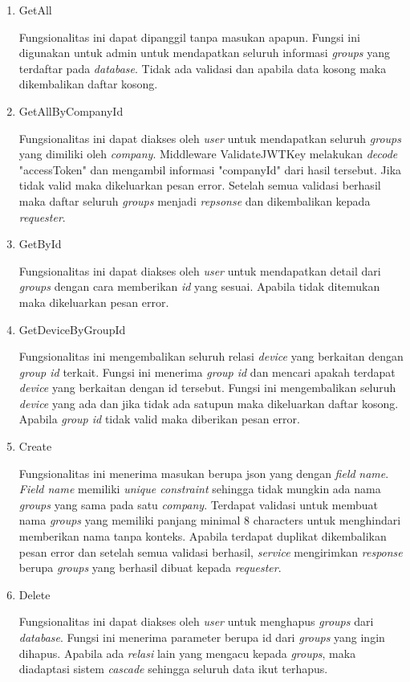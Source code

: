 \begin{enumerate}
  \item GetAll

        Fungsionalitas ini dapat dipanggil tanpa masukan apapun. Fungsi ini digunakan untuk admin untuk mendapatkan seluruh informasi \textit{groups} yang terdaftar pada \textit{database}. Tidak ada validasi dan apabila data kosong maka dikembalikan daftar kosong.

  \item GetAllByCompanyId

        Fungsionalitas ini dapat diakses oleh \textit{user} untuk mendapatkan seluruh \textit{groups} yang dimiliki oleh \textit{company}. Middleware ValidateJWTKey  melakukan \textit{decode} "accessToken" dan mengambil informasi "companyId" dari hasil tersebut. Jika tidak valid maka dikeluarkan pesan error. Setelah semua validasi berhasil maka daftar seluruh \textit{groups} menjadi \textit{repsonse} dan dikembalikan kepada \textit{requester}.

  \item GetById

        Fungsionalitas ini dapat diakses oleh \textit{user} untuk mendapatkan detail dari \textit{groups} dengan cara memberikan \textit{id} yang sesuai. Apabila tidak ditemukan maka dikeluarkan pesan error.

  \item GetDeviceByGroupId


        Fungsionalitas ini mengembalikan seluruh relasi \textit{device} yang berkaitan dengan \textit{group id} terkait. Fungsi ini menerima \textit{group id} dan mencari apakah terdapat \textit{device} yang berkaitan dengan id tersebut. Fungsi ini mengembalikan seluruh \textit{device} yang ada dan jika tidak ada satupun maka dikeluarkan daftar kosong. Apabila \textit{group id} tidak valid maka diberikan pesan error.

  \item Create

        Fungsionalitas ini menerima masukan berupa json yang dengan \textit{field} \textit{name}. \textit{Field name} memiliki \textit{unique constraint} sehingga tidak mungkin ada nama \textit{groups} yang sama pada satu \textit{company}. Terdapat validasi untuk membuat nama \textit{groups} yang memiliki panjang minimal 8 characters untuk menghindari memberikan nama tanpa konteks. Apabila terdapat duplikat dikembalikan pesan error dan setelah semua validasi berhasil, \textit{service} mengirimkan \textit{response} berupa \textit{groups} yang berhasil dibuat kepada \textit{requester}.

  \item Delete

        Fungsionalitas ini dapat diakses oleh \textit{user} untuk menghapus \textit{groups} dari \textit{database}. Fungsi ini menerima parameter berupa id dari \textit{groups} yang ingin dihapus. Apabila ada \textit{relasi} lain yang mengacu kepada \textit{groups}, maka diadaptasi sistem \textit{cascade} sehingga seluruh data ikut terhapus.

\end{enumerate}


